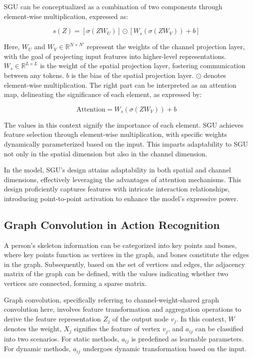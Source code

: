 \documentclass[conference,a4paper,english]{IEEEtran}[2015/08/26]
\begin{document}
SGU can be conceptualized as a combination of two components through element-wise multiplication, expressed as:

\[
s(Z) = [\sigma(ZW_U)] \odot [W_s(\sigma(ZW_V)) + b]   \tag{2}
\]

Here, $W_U$ and $W_V \in \mathbb{R}^{N \times N'}$ represent the weights of the channel projection layer, with the goal of projecting input features into higher-level representations. $W_s \in \mathbb{R}^{L \times L}$ is the weight of the spatial projection layer, fostering communication between any tokens. $b$ is the bias of the spatial projection layer. $\odot$ denotes element-wise multiplication. The right part can be interpreted as an attention map, delineating the significance of each element, as expressed by:

\[
\text{Attention} = W_s(\sigma(ZW_V)) + b   \tag{3}
\]

The values in this context signify the importance of each element. SGU achieves feature selection through element-wise multiplication, with specific weights dynamically parameterized based on the input. This imparts adaptability to SGU not only in the spatial dimension but also in the channel dimension.

In the model, SGU's design attains adaptability in both spatial and channel dimensions, effectively leveraging the advantages of attention mechanisms. This design proficiently captures features with intricate interaction relationships, introducing point-to-point activation to enhance the model's expressive power.
\subsection{Graph Convolution in Action Recognition}
A person's skeleton information can be categorized into key points and bones, where key points function as vertices in the graph, and bones constitute the edges in the graph. Subsequently, based on the set of vertices and edges, the adjacency matrix of the graph can be defined, with the values indicating whether two vertices are connected, forming a sparse matrix.

Graph convolution, specifically referring to channel-weight-shared graph convolution here, involves feature transformation and aggregation operations to derive the feature representation \(Z_j\) of the output node \(v_j\). In this context, \(W\) denotes the weight, \(X_j\) signifies the feature of vertex \(v_j\), and \(a_{ij}\) can be classified into two scenarios. For static methods, \(a_{ij}\) is predefined as learnable parameters. For dynamic methods, \(a_{ij}\) undergoes dynamic transformation based on the input.
\end{document}

